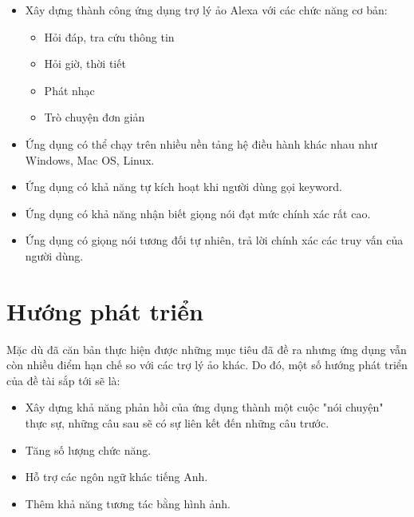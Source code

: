 \begin{itemize}
    \item Xây dựng thành công ứng dụng trợ lý ảo Alexa với các chức năng cơ bản:
    \begin{itemize}
        \item Hỏi đáp, tra cứu thông tin
        \item Hỏi giờ, thời tiết
        \item Phát nhạc
        \item Trò chuyện đơn giản
    \end{itemize}
    \item Ứng dụng có thể chạy trên nhiều nền tảng hệ điều hành khác nhau như Windows, Mac OS, Linux.
    \item Ứng dụng có khả năng tự kích hoạt khi người dùng gọi keyword.
    \item Ứng dụng có khả năng nhận biết giọng nói đạt mức chính xác rất cao.
    \item Ứng dụng có giọng nói tương đối tự nhiên, trả lời chính xác các truy vấn của người dùng.
\end{itemize}

\section{Hướng phát triển}

Mặc dù đã căn bản thực hiện được những mục tiêu đã đề ra nhưng ứng dụng vẫn còn nhiều điểm hạn chế so với các trợ lý ảo khác. Do đó, một số hướng phát triển của đề tài sắp tới sẽ là:

\begin{itemize}
    \item Xây dựng khả năng phản hồi của ứng dụng thành một cuộc "nói chuyện" thực sự, những câu sau sẽ có sự liên kết đến những câu trước.
    \item Tăng số lượng chức năng.
    \item Hỗ trợ các ngôn ngữ khác tiếng Anh.
    \item Thêm khả năng tương tác bằng hình ảnh.
\end{itemize}



